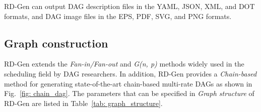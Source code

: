RD-Gen can output DAG description files in the YAML, JSON, XML, and DOT formats, and DAG image files in the EPS, PDF, SVG, and PNG formats.


\subsection{Graph construction}
\label{ssec: graph_construction}

RD-Gen extends the {\it Fan-in/Fan-out} \cite{tgff} and {\it G(n, p)} \cite{cordeiro2010random} methods widely used in the scheduling field by DAG researchers.
In addition, RD-Gen provides a {\it Chain-based} method for generating state-of-the-art chain-based multi-rate DAGs as shown in Fig.~\ref{fig: chain_dag}.
The parameters that can be specified in {\it Graph structure} of RD-Gen are listed in Table~\ref{tab: graph_structure}.


\begin{table}[tb]
    \centering
    \caption{Helper functions in the algorithms}
    \label{tab: helper_functions}
    \renewcommand{\arraystretch}{1.2}
\end{table}


